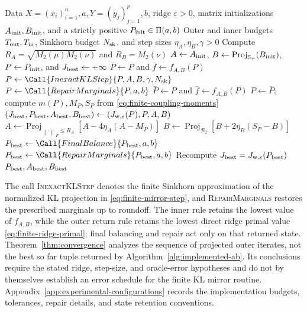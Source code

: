 \documentclass[11pt]{article}
\newcommand{\norm}[1]{\left\lVert #1\right\rVert}
\theoremstyle{plain}
\theoremstyle{definition}
\theoremstyle{remark}
\begin{document}
\begin{algorithm}[t]
\caption{Implemented projected \(A\)--\(B\) solver with an inexact weak OT oracle}
\label{alg:implemented-ab}
\small
\begin{algorithmic}[1]
\Require Data \(X=(x_i)_{i=1}^n,a,Y=(y_j)_{j=1}^p,b\), ridge
  \(\varepsilon>0\), matrix initializations \(A_{\rm init},B_{\rm init}\), and
  a strictly positive \(P_{\rm init}\in\Pi(a,b)\)
\Require Outer and inner budgets \(T_{\rm out},T_{\rm in}\), Sinkhorn budget
  \(N_{\rm sk}\), and step sizes \(\eta_A,\eta_B,\gamma>0\)
\State Compute \(R_A=\sqrt{M_2(\mu)M_2(\nu)}\) and \(R_B=M_2(\nu)\)
\State \(A\gets A_{\rm init}\), \(B\gets\operatorname{Proj}_{\mathbb S_+}(B_{\rm init})\),
  \(P\gets P_{\rm init}\), and \(J_{\rm best}\gets+\infty\)
  \State \(\bar P\gets P\) and \(\bar f\gets f_{A,B}(P)\)
    \State \(P\gets\Call{InexactKLStep}{P,A,B,\gamma,N_{\rm sk}}\)
    \State \(P\gets\Call{RepairMarginals}{P,a,b}\)
      \State \(\bar P\gets P\) and \(\bar f\gets f_{A,B}(P)\)
    \EndIf
  \EndFor
  \State \(P\gets\bar P\); compute \(m(P),M_P,S_P\) from
    \eqref{eq:finite-coupling-moments}
    \State \((J_{\rm best},P_{\rm best},A_{\rm best},B_{\rm best})
      \gets(J_{\rm w,\varepsilon}(P),P,A,B)\)
  \EndIf
  \State \(A\gets\operatorname{Proj}_{\norm{\cdot}_F\le R_A}
    [A-4\eta_A(A-M_P)]\)
  \State \(B\gets\operatorname{Proj}_{\mathcal B_2}
    [B+2\eta_B(S_P-B)]\)
\EndFor
\State \(P_{\rm best}\gets\Call{FinalBalance}{P_{\rm best},a,b}\)
\State \(P_{\rm best}\gets\Call{RepairMarginals}{P_{\rm best},a,b}\)
\State Recompute \(J_{\rm best}=J_{\rm w,\varepsilon}(P_{\rm best})\)
\Ensure \(P_{\rm best},A_{\rm best},B_{\rm best}\)
\end{algorithmic}
\end{algorithm}

The call \textsc{InexactKLStep} denotes the finite Sinkhorn approximation of the
normalized KL projection in \eqref{eq:finite-mirror-step}, and
\textsc{RepairMarginals} restores the prescribed marginals up to roundoff. The inner
rule retains the lowest value of \(f_{A,B}\), while the outer return rule retains
the lowest direct ridge primal value \eqref{eq:finite-ridge-primal}; final balancing
and repair act only on that returned state. Theorem~\ref{thm:convergence} analyzes the sequence of projected
outer iterates, not the best so far tuple returned by Algorithm~\ref{alg:implemented-ab}.
Its conclusions require the stated ridge, step-size, and oracle-error hypotheses
and do not by themselves establish an error schedule for the finite KL mirror
routine. Appendix~\ref{app:experimental-configurations} records the implementation
budgets, tolerances, repair details, and state retention conventions.
\end{document}
